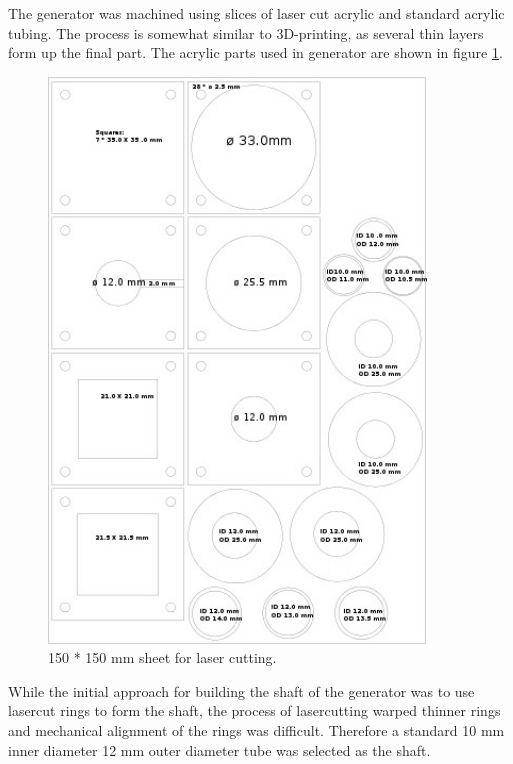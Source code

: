 The generator was machined using slices of laser cut acrylic and standard acrylic tubing. The process is somewhat similar to 3D-printing, as several thin layers form up the final part. The acrylic parts used in generator are shown in figure \ref{fig:lasercut}.

\begin{figure}[htb]
  \begin{center}
    \includegraphics[height=15cm]{images/own_dwg/mechanical/layers.jpg}
  \end{center}
  \caption{\label{fig:lasercut} 150 * 150 mm sheet for laser cutting.}
\end{figure}

While the initial approach for building the shaft of the generator was to use lasercut rings to form the shaft, the process of lasercutting warped thinner rings and mechanical alignment of the rings was difficult. Therefore a standard 10 mm inner diameter 12 mm outer diameter tube was selected as the shaft.

